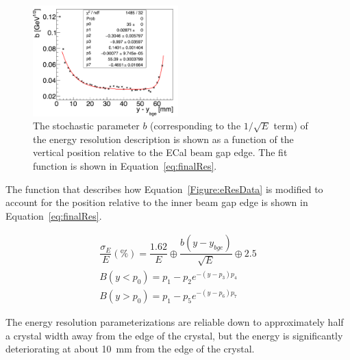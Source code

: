 \begin{figure}[H]
  \centering
      \includegraphics[width=0.5\textwidth]{pics/performance/eResEdgeEffect.png}
  \caption[Characterization of the energy resolution edge effects ]{The stochastic parameter $b$ (corresponding to the $1/\sqrt{E}$ term) of the energy resolution description is shown as a function of the vertical position relative to the ECal beam gap edge. The fit function is shown in Equation~\eqref{eq:finalRes}.}
  \label{Figure:stochasticEdge}
\end{figure}

The function that describes how Equation~\eqref{Figure:eResData} is modified to account for the position relative to the inner beam gap edge is shown in Equation~\eqref{eq:finalRes}.

\begin{equation}
\begin{split}
\label{eq:finalRes}
\dfrac{\sigma_E}{E}(\%)=\dfrac{1.62}{E}\oplus \dfrac{b(y-y_{bge})}{\sqrt{E}} \oplus 2.5 \\
B(y<p_0) = p_1-p_2 e^{-(y-p_3)p_4}\\
B(y>p_0) = p_1-p_5 e^{-(y-p_6)p_7}
\end{split}
\end{equation}

The energy resolution parameterizations are reliable down to approximately half a crystal width away from the edge of the crystal, but the energy is significantly deteriorating at about 10~mm from the edge of the crystal. ~\cite{CalibNote}
